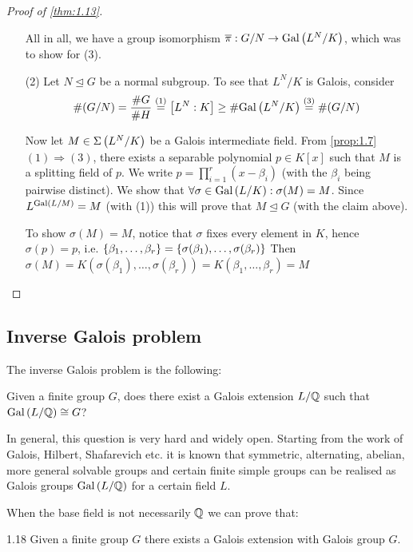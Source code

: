 \documentclass[twoside = false,	%
		headsepline,		%
		parskip = true,
		]{scrbook}						%
\begin{document}
\begin{proof}[Proof of \ref{thm:1.13}]
\begin{enumerate}
            All in all, we have a group isomorphism $\overline\pi:G/N\to \mathrm{Gal}\left( L^N/K\right)$, which was to show for (3).
            
            \item[(2)]
            Let $N\trianglelefteq G$ be a normal subgroup. To see that $L^N/K$ is Galois, consider
            $$\#(G/N)= \frac{\#G}{\#H}\overset{(1)}=\left[ L^N:K\right]\geq\#\mathrm{Gal}\left( L^N/K\right)\overset{(3)} = \#(G/N)$$
            
            Now let $M\in\Sigma\left( L^N/K\right)$ be a Galois intermediate field. From \ref{prop:1.7} $(1)\Rightarrow(3)$, there exists a separable polynomial $p\in K[x]$ such that $M$ is a splitting field of $p$. We write $p=\prod_{i=1}^r(x-\beta_i)$ (with the $\beta_i$ being pairwise distinct). We show that $\forall\sigma \in\mathrm{Gal}\left( L/K\right): \sigma(M)=M$. Since $L^{\mathrm{Gal}\left( L/M\right)}=M$ (with (1)) this will prove that $M\trianglelefteq G$ (with the claim above).
            
            To show $\sigma(M)=M$, notice that $\sigma$ fixes every element in $K$, hence $\sigma(p)=p$, i.e. $\left\{ \beta_1,\dots,\beta_r\right\}=\left\{ \sigma(\beta_1),\dots,\sigma(\beta_r)\right\}$
            Then $\sigma(M)=K(\sigma(\beta_1),\dots,\sigma(\beta_r))=K(\beta_1,\dots,\beta_r)=M$
        \end{enumerate}
        \end{proof}
        
        
    \subsection{Inverse Galois problem}
        The inverse Galois problem is the following:
        
        Given a finite group $G$, does there exist a Galois extension $L/\mathbb Q$ such that $\mathrm{Gal}\left( L/\mathbb Q\right) \cong G$?
        
        In general, this question is very hard and widely open. Starting from the work of Galois, Hilbert, Shafarevich etc. it is known that symmetric, alternating, abelian, more general solvable groups and certain finite simple groups can be realised as Galois groups $\mathrm{Gal}\left( L/\mathbb Q\right)$ for a certain field $L$.
        
        When the base field is not necessarily $\mathbb Q$ we can prove that:
        
        \begin{corollary}{}{1.18}
            Given a finite group $G$ there exists a Galois extension with Galois group $G$.
        \end{corollary}
        
\end{document}
